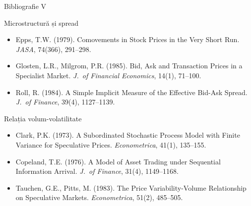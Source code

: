 \documentclass[9pt, aspectratio=169, t]{beamer}
\theoremstyle{definition}
\newenvironment{cminipage}[1]{%
    \par\noindent\hfill\begin{minipage}{#1}\ignorespaces
}{%
    \end{minipage}\hfill\null\par
}
\begin{document}
\begin{frame}{Bibliografie V}
    \vspace{-0.3cm}
    \begin{cminipage}{0.95\textwidth}
    \begin{block}{Microstructură și spread}
        {\small
        \begin{itemize}\setlength{\itemsep}{0pt}
            \item Epps, T.W. (1979). Comovements in Stock Prices in the Very Short Run. \textit{JASA}, 74(366), 291--298.
            \item Glosten, L.R., Milgrom, P.R. (1985). Bid, Ask and Transaction Prices in a Specialist Market. \textit{J.\ of Financial Economics}, 14(1), 71--100.
            \item Roll, R. (1984). A Simple Implicit Measure of the Effective Bid-Ask Spread. \textit{J.\ of Finance}, 39(4), 1127--1139.
        \end{itemize}
        }
    \end{block}

    \begin{exampleblock}{Relația volum-volatilitate}
        {\small
        \begin{itemize}\setlength{\itemsep}{0pt}
            \item Clark, P.K. (1973). A Subordinated Stochastic Process Model with Finite Variance for Speculative Prices. \textit{Econometrica}, 41(1), 135--155.
            \item Copeland, T.E. (1976). A Model of Asset Trading under Sequential Information Arrival. \textit{J.\ of Finance}, 31(4), 1149--1168.
            \item Tauchen, G.E., Pitts, M. (1983). The Price Variability-Volume Relationship on Speculative Markets. \textit{Econometrica}, 51(2), 485--505.
        \end{itemize}
        }
    \end{exampleblock}
    \end{cminipage}
\end{frame}
\end{document}
